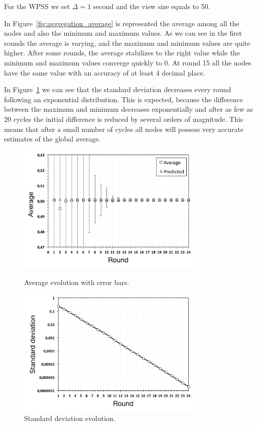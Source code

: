 For the \ac{WPSS} we set $\Delta = 1$ second and the view size equals to 50. 

In Figure~\ref{fig:aggregation_average} is represented the average among all the nodes and also the minimum and maximum values. As we can see in the first rounds the average is varying, and the maximum and minimum values are quite higher. After some rounds, the average stabilizes to the right value while the minimum and maximum values converge quickly to 0. At round 15 all the nodes have the same value with an accuracy of at least 4 decimal place. 

In Figure~\ref{fig:aggregation_standard_deviation} we can see that the standard deviation decreases every round following an exponential distribution. This is expected, because the difference between the maximum and minimum decreases exponentially and after as few as 20 cycles the initial difference is reduced by several orders of magnitude. This means that after a small number of cycles all nodes will possess very accurate estimates of the global average.

\begin{figure}[p]
\centering
\includegraphics[keepaspectratio=true, width=0.8\textwidth]{images/aggregation_average}
\caption{Average evolution with error bars.}
\label{fig:aggregation_average}
\includegraphics[keepaspectratio=true, width=0.8\textwidth]{images/aggregation_standard_deviation}
\caption{Standard deviation evolution.}
\label{fig:aggregation_standard_deviation}
\end{figure}

